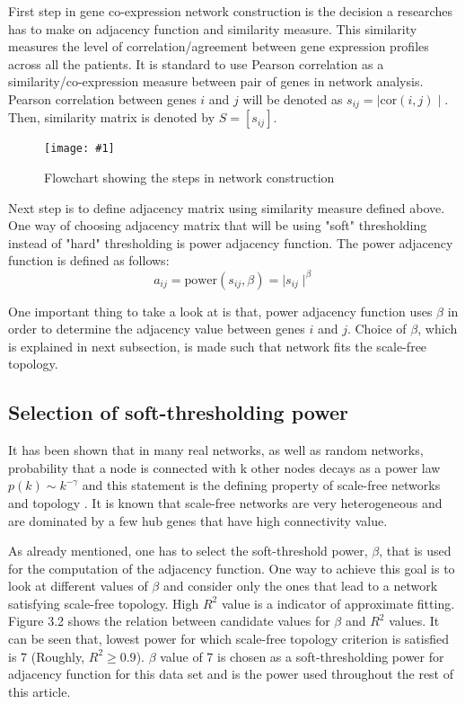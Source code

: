 \documentclass{ba-kecs}
\numberwithin{figure}{section}
\numberwithin{equation}{section}
\newcommand{\dkepicH}[2]{ %
	\begin{figure}[H] %
	\texttt{[image: \#1]}
	\caption{#2}
	\label{#1}
	\end{figure}
}
\begin{document}
First step in gene co-expression network construction is the decision a researches has to make on adjacency function and similarity measure. This similarity measures the level of correlation/agreement between gene expression profiles across all the patients. It is standard to use Pearson correlation as a similarity/co-expression measure between pair of genes in network analysis. Pearson correlation between genes $i$ and $j$ will be denoted as $s_{ij} = \mid\mathrm{cor}(i,j)\mid $. Then, similarity matrix is denoted by $S = [s_{ij}] $.

\dkepicH{flowchart}{Flowchart showing the steps in network construction}

Next step is to define adjacency matrix using similarity measure defined above. One way of choosing adjacency matrix that will be using "soft" thresholding instead of "hard" thresholding is power adjacency function. The power adjacency function is defined as follows:
\begin{equation}
a_{ij} = \mathrm{power}(s_{ij},\beta) = \mid s_{ij} \mid^\beta
\end{equation}

One important thing to take a look at is that, power adjacency function uses $\beta$ in order to determine the adjacency value between genes $i$ and $j$. Choice of $\beta$, which is explained in next subsection, is made such that network fits the scale-free topology.

\subsection{Selection of soft-thresholding power}

It has been shown that in many real networks, as well as random networks, probability that a node is connected with k other nodes decays as a power law $p(k) \sim k ^{-\gamma}$ and this statement is the defining property of scale-free networks and topology \cite{barabas1999}. It is known that scale-free networks are very heterogeneous and are dominated by a few hub genes that have high connectivity value.

As already mentioned, one has to select the soft-threshold power, $\beta$, that is used for the computation of the adjacency function. One way to achieve this goal is to look at different values of $\beta$ and consider only the ones that lead to a network satisfying scale-free topology. High $R^2$ value is a indicator of approximate fitting. Figure 3.2 shows the relation between candidate values for $\beta$ and $R^2$ values. It can be seen that, lowest power for which scale-free topology criterion is satisfied is 7 (Roughly, $R^2 \geq 0.9$). $\beta$ value of 7 is chosen as a soft-thresholding power for adjacency function for this data set and is the power used throughout the rest of this article.
\end{document}

